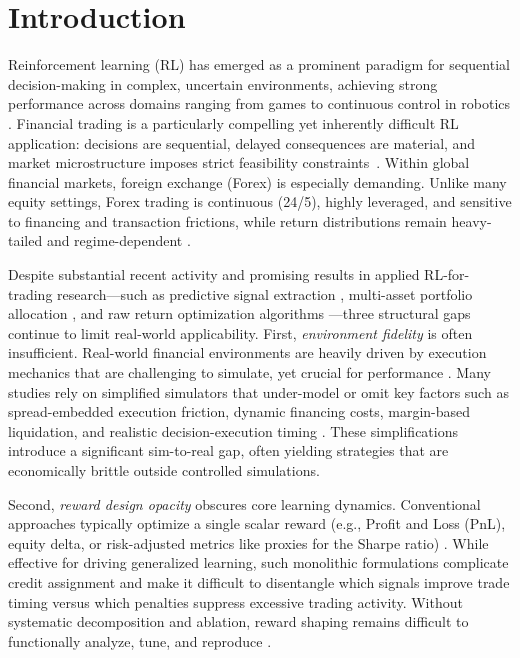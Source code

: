 \section{Introduction}
\label{sec:introduction}

Reinforcement learning (RL) has emerged as a prominent paradigm for sequential decision-making in complex, uncertain environments, achieving strong performance across domains ranging from games to continuous control in robotics \citep{mnih2015humanlevel,sutton2018reinforcement}. Financial trading is a particularly compelling yet inherently difficult RL application: decisions are sequential, delayed consequences are material, and market microstructure imposes strict feasibility constraints~\citep{moody2001learning,zhang2020deep,gould2013limit}. Within global financial markets, foreign exchange (Forex) is especially demanding. Unlike many equity settings, Forex trading is continuous (24/5), highly leveraged, and sensitive to financing and transaction frictions, while return distributions remain heavy-tailed and regime-dependent \citep{cont2001empirical}.

Despite substantial recent activity and promising results in applied RL-for-trading research—such as predictive signal extraction \citep{deng2016deep}, multi-asset portfolio allocation \citep{jiang2017deep}, and raw return optimization algorithms \citep{meng2019reinforcement,theate2021application}—three structural gaps continue to limit real-world applicability. First, \emph{environment fidelity} is often insufficient. Real-world financial environments are heavily driven by execution mechanics that are challenging to simulate, yet crucial for performance \citep{zhang2020deep}. Many studies rely on simplified simulators that under-model or omit key factors such as spread-embedded execution friction, dynamic financing costs, margin-based liquidation, and realistic decision-execution timing \citep{carapuco2018reinforcement,rundo2019deep}. These simplifications introduce a significant sim-to-real gap, often yielding strategies that are economically brittle outside controlled simulations.

Second, \emph{reward design opacity} obscures core learning dynamics. Conventional approaches typically optimize a single scalar reward (e.g., Profit and Loss (PnL), equity delta, or risk-adjusted metrics like proxies for the Sharpe ratio) \citep{moody2001learning,sharpe1994sharpe,theate2021application}. While effective for driving generalized learning, such monolithic formulations complicate credit assignment and make it difficult to disentangle which signals improve trade timing versus which penalties suppress excessive trading activity. Without systematic decomposition and ablation, reward shaping remains difficult to functionally analyze, tune, and reproduce \citep{ng1999policy}.

